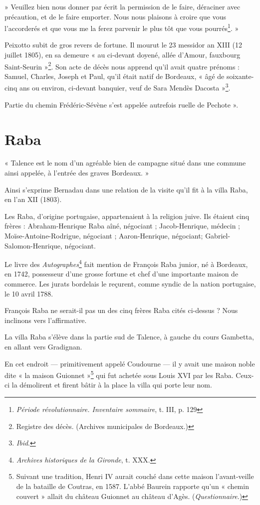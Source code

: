 » Veuillez bien nous donner par écrit la permission de le faire, déraciner avec précaution, et de le faire emporter. Nous nous plaisons à croire que vous l'accorderés et que vous me la ferez parvenir le plus tôt que vous pourrés\footnote{\textit{Période révolutionnaire. Inventaire sommaire}, t. III, p. 129}. »

Peixotto subit de gros revers de fortune. Il mourut le 23 messidor an XIII (12 juillet 1805), en sa demeure « au ci-devant doyené, allée d'Amour, fauxbourg Saint-Seurin »\footnote{Registre des décès. (Archives municipales de Bordeaux.)}. Son acte de décès nous apprend qu'il avait quatre prénoms : Samuel, Charles, Joseph et Paul, qu'il était natif de Bordeaux, « âgé de soixante-cinq ans ou environ, ci-devant banquier, veuf de Sara Mendès Dacosta »\footnote{\textit{Ibid}.}.

Partie du chemin Frédéric-Sévène s'est appelée autrefois ruelle de Pechote ».

\section{Raba}

« Talence est le nom d'un agréable bien de campagne situé dans une commune ainsi appelée, à l'entrée des graves Bordeaux. »

Ainsi s'exprime Bernadau dans une relation de la visite qu'il fit à la villa Raba, en l'an XII (1803).

Les Raba, d'origine portugaise, appartenaient à la religion juive. Ils étaient cinq frères : Abraham-Henrique Raba aîné, négociant ; Jacob-Henrique, médecin ; Moïse-Antoine-Rodrigue, négociant ; Aaron-Henrique, négociant; Gabriel-Salomon-Henrique, négociant.

Le livre des \textit{Autographes}\footnote{\textit{Archives historiques de la Gironde}, t. XXX.} fait mention de François Raba junior, né à Bordeaux, en 1742, possesseur d'une grosse fortune et chef d'une importante maison de commerce. Les jurats bordelais le reçurent, comme syndic de la nation portugaise, le 10 avril 1788.

François Raba ne serait-il pas un des cinq frères Raba cités ci-dessus ? Nous inclinons vers l'affirmative.

La villa Raba s'élève dans la partie sud de Talence, à gauche du cours Gambetta, en allant vers Gradignan.

En cet endroit — primitivement appelé Coudourne — il y avait une maison noble dite « la maison Guionnet »\footnote{Suivant une tradition, Henri IV aurait couché dans cette maison l'avant-veille de la bataille de Coutras, en 1587. L'abbé Baurein rapporte qu'un « chemin couvert » allait du château Guionnet au château d'Agès. (\textit{Questionnaire}.)} qui fut achetée sous Louis XVI par les Raba. Ceux-ci la démolirent et firent bâtir à la place la villa qui porte leur nom.

